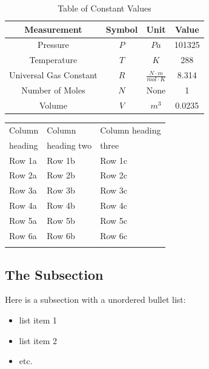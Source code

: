 \documentclass{psig_required_latex_files/psig}
\begin{document}
\begin{table}
{\renewcommand{\arraystretch}{1.3}
\caption{Table of Constant Values}\label{table:1}
  \begin{center}
  \begin{tabular}{| c | c | c | c |}
    \hline
    \textbf{Measurement} & \textbf{Symbol} & \textbf{Unit} & \textbf{Value} \\ \hline
    Pressure & $P$ & $Pa$ & 101325 \\ \hline
    Temperature & $T$ & $K$ & 288 \\ \hline
    Universal Gas Constant & $R$ & $\frac{N\cdot m}{mol \cdot K}$ & 8.314 \\ \hline
    Number of Moles & $N$ & None & 1 \\ \hline
    Volume & $V$ & $m^3$ & 0.0235 \\
    \hline
  \end{tabular}
  \end{center}
}
\end{table}

\lipsum[11]

\begin{table}
{\begin{tabular*}{20pc}{@{\extracolsep{\fill}}lll@{}}\toprule
Column  &Column  & Column heading \\
heading  &heading two &  three \\
\midrule
Row 1a  &Row 1b  &Row 1c \\
Row 2a  &Row 2b  &Row 2c \\
Row 3a  &Row 3b  & Row 3c \\
Row 4a  &Row 4b  &Row 4c \\
Row 5a  &Row 5b  &Row 5c \\
Row 6a  & Row 6b  & Row 6c \\
\botrule
\end{tabular*}}{}
\end{table}

\subsection{The Subsection}

Here is a subsection with a unordered bullet list:

\begin{itemize}
\item list item 1
\item list item 2
\item etc.
\end{itemize}
\end{document}
